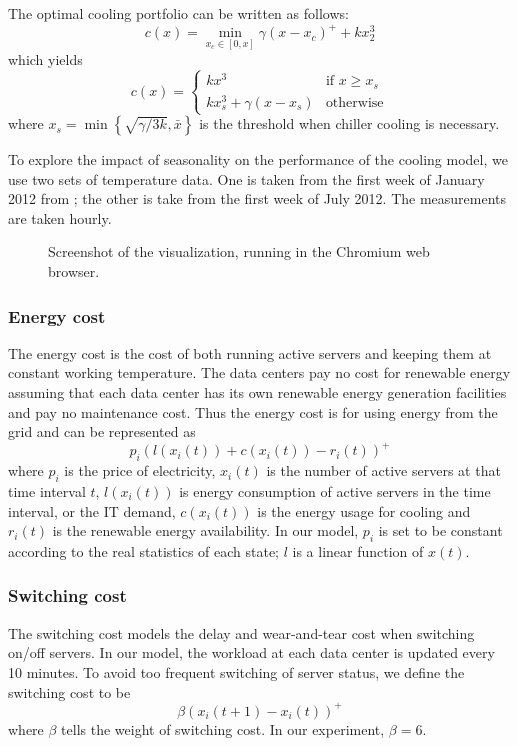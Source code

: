 \documentclass{acm_proc_article-sp}
\begin{document}
The optimal cooling portfolio can be written as follows:
\begin{equation}
c(x) =  \min_{x_c \in [0,x]} \gamma(x-x_c)^+ + kx_2^3
\end{equation}
which yields
$$
c(x) = \left\{ \begin{array}{ll}
         kx^3 & \mbox{if $x \geq x_s$}\\
        kx_s^3 + \gamma (x-x_s) & \mbox{otherwise}\end{array} \right.
$$
where $x_s = \min \left\{\sqrt{\gamma/3k}, \bar{x}\right\}$ is the threshold when chiller cooling is necessary.

To explore the impact of seasonality on the performance of the cooling model, we use two sets of temperature data. One is taken from the first week of January 2012 from \cite{temp}; the other is take from the first week of July 2012. The measurements are taken hourly.

\begin{figure*}
\centering
{}
\caption{Screenshot of the visualization, running in the Chromium web browser.}
\end{figure*}
\subsubsection{Energy cost}
The energy cost is the cost of both running active servers and keeping them at constant working temperature. The data centers pay no cost for renewable energy assuming that each data center has its own renewable energy generation facilities and pay no maintenance cost. Thus the energy cost is for using energy from the grid and can be represented as
\begin{equation}
p_i(l(x_i(t)) + c(x_i(t)) - r_i(t))^+
\end{equation}  
where $p_i$ is the price of electricity, $x_i(t)$ is the number of active servers at that time interval $t$, $l(x_i(t))$ is energy consumption of active servers in the time interval, or the IT demand, $c(x_i(t))$ is the energy usage for cooling and $r_i(t)$ is the renewable energy availability. In our model, $p_i$ is set to be constant according to the real statistics of each state; $l$ is a linear function of $x(t)$.

\subsubsection{Switching cost}
The switching cost models the delay and wear-and-tear cost when switching on/off servers. In our model, the workload at each data center is updated every 10 minutes. To avoid too frequent switching of server status, we define the switching cost to be
$$\beta(x_i(t+1) - x_i(t))^+$$
where $\beta$ tells the weight of switching cost. In our experiment, $\beta = 6$.
\end{document}
